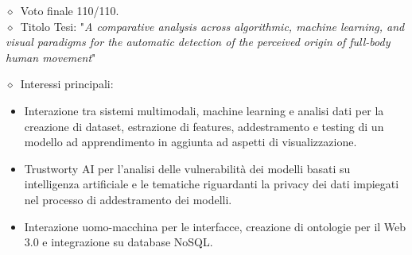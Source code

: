 \documentclass[11pt, a4paper]{article}
\newcommand{\smaller}[1]{{\small$\diamond$\ #1}}
\begin{document}
\begin{minipage}[t]{0.57\textwidth}
        \begin{translate}
            \smaller{Voto finale} 110/110. \\
            \smaller{Titolo Tesi}: "\textit{A comparative analysis across algorithmic, machine learning, and visual paradigms for the automatic detection of the perceived origin of full-body human movement}" \href{https://github.com/gaggioaxel/OoM-Thesis}{\textcolor{black}{\faExternalLink}} \\
            \smaller{Interessi principali: 
                \begin{itemize}
                    \item Interazione tra sistemi multimodali, machine learning e analisi dati per la creazione di dataset, estrazione di features, addestramento e testing di un modello ad apprendimento in aggiunta ad aspetti di visualizzazione.
                    \item Trustworty AI per l'analisi delle vulnerabilità dei modelli basati su intelligenza artificiale e le tematiche riguardanti la privacy dei dati impiegati nel processo di addestramento dei modelli.
                    \item Interazione uomo-macchina per le interfacce, creazione di ontologie per il Web 3.0 e integrazione su database NoSQL.
                \end{itemize}
            }
        \end{translate}


\end{minipage}
\end{document}
